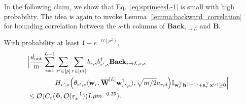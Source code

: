 		In the following claim, we show that Eq.~\ref{eq:sprimeesL-1} is small with high probability. The idea is again to invoke Lemma~\ref{lemma:backward_correlation} for bounding correlation between the $s$-th columns of $\mathbf{Back}_{i \to L}$ and $\mathbf{B}$.
		\begin{claim}
			With probability at least $1-e^{-\Omega(\rho^2)}$,
			\begin{align*}
				&\Big|\frac{d_{\mathrm{out}} }{m} \sum_{i=1}^{L-1}  \sum_{r' \in [p]} \sum_{r \in [m]}  b_{r, s} b_{r', s}^{\dagger} \mathbf{Back}_{i \to L, r, s} \\& \quad \quad \quad \quad H_{r', s}\Big(\theta_{r', s} \langle \mathbf{w}_{r}, \overline{\mathbf{W}}^{[L]} \mathbf{w}_{r', s}^{\dagger}\rangle, \sqrt{m/2} a_{r, d}\Big) \mathbb{I}_{\mathbf{w}_r^{\top} \mathbf{h}^{(i-1)} + \mathbf{a}_r^{\top} \mathbf{x}^{(i)} \ge 0}\Big| \\&
				\le \mathcal{O}(C_\varepsilon(\Phi, \mathcal{O}( \varepsilon_x^{-1})) L \rho m^{-0.25}).
			\end{align*}
		\end{claim}
		

